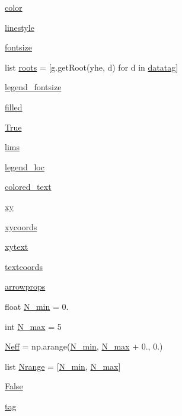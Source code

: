 \begin{DoxyCompactItemize}
\mbox{\hyperlink{namespacebbn__yhe_a5febb2e61726249209662394b5d95858}{color}}
\item 
\mbox{\hyperlink{namespacebbn__yhe_af98c0d13e6e8393dac53d8e115f2c906}{linestyle}}
\item 
\mbox{\hyperlink{namespacebbn__yhe_a3bb9da91cb045382b8f944eb5c8e14fe}{fontsize}}
\item 
list \mbox{\hyperlink{namespacebbn__yhe_ab2add45031a3e0b76e777d91fd6eff67}{roots}} = \mbox{[}g.\+get\+Root(\textquotesingle{}yhe\textquotesingle{}, d) for d in \mbox{\hyperlink{namespacebbn__yhe_a063490560da67d4aa74baa317b66577a}{datatag}}\mbox{]}
\item 
\mbox{\hyperlink{namespacebbn__yhe_ac2c1a41c88f2f983a89e6f3af095d520}{legend\+\_\+fontsize}}
\item 
\mbox{\hyperlink{namespacebbn__yhe_a27906639887f7d86e9893c3c8c102f9b}{filled}}
\item 
\mbox{\hyperlink{namespacebbn__yhe_a6d53cb6d1d4b9038a14d5b038ef4b4ff}{True}}
\item 
\mbox{\hyperlink{namespacebbn__yhe_a8fb3d2af891fa129948db45632d05b4c}{lims}}
\item 
\mbox{\hyperlink{namespacebbn__yhe_aadedc8e6798c93b5bf445f5d1bd0c19f}{legend\+\_\+loc}}
\item 
\mbox{\hyperlink{namespacebbn__yhe_a49bc13f65125eafd22fc160f104e8444}{colored\+\_\+text}}
\item 
\mbox{\hyperlink{namespacebbn__yhe_a3123808ee1e6304665a2980e073efed9}{xy}}
\item 
\mbox{\hyperlink{namespacebbn__yhe_a24e8c7a1ae7d3b9a225c19f2a79cf681}{xycoords}}
\item 
\mbox{\hyperlink{namespacebbn__yhe_a26224bf035e3019da5ed20ac3aece4e8}{xytext}}
\item 
\mbox{\hyperlink{namespacebbn__yhe_ad9e6a1e307d4e22bacaa587397fa346e}{textcoords}}
\item 
\mbox{\hyperlink{namespacebbn__yhe_a4e580183b4dd2ab4042be13ffec6c525}{arrowprops}}
\item 
float \mbox{\hyperlink{namespacebbn__yhe_a12d17f1eceb939479da944d753f67417}{N\+\_\+min}} = 0.
\item 
int \mbox{\hyperlink{namespacebbn__yhe_a97d4d46b2f4aad7933899daacdfa4e8d}{N\+\_\+max}} = 5
\item 
\mbox{\hyperlink{namespacebbn__yhe_a0974f7b16b7e2bc7419b63acb59f5a68}{Neff}} = np.\+arange(\mbox{\hyperlink{namespacebbn__yhe_a12d17f1eceb939479da944d753f67417}{N\+\_\+min}}, \mbox{\hyperlink{namespacebbn__yhe_a97d4d46b2f4aad7933899daacdfa4e8d}{N\+\_\+max}} + 0., 0.)
\item 
list \mbox{\hyperlink{namespacebbn__yhe_aaa4728644822d8c49e68fadd68ede623}{Nrange}} = \mbox{[}\mbox{\hyperlink{namespacebbn__yhe_a12d17f1eceb939479da944d753f67417}{N\+\_\+min}}, \mbox{\hyperlink{namespacebbn__yhe_a97d4d46b2f4aad7933899daacdfa4e8d}{N\+\_\+max}}\mbox{]}
\item 
\mbox{\hyperlink{namespacebbn__yhe_af0aeb2348a1c9932c656174611593164}{False}}
\item 
\mbox{\hyperlink{namespacebbn__yhe_a77232bd6b32ee374dbd5504aaba84b10}{tag}}
\end{DoxyCompactItemize}


